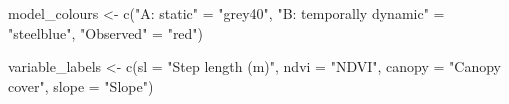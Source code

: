 \documentclass[
  letterpaper,
  DIV=11,
  numbers=noendperiod]{scrartcl}
\newenvironment{Shaded}{\begin{snugshade}}{\end{snugshade}}
\newcommand{\AttributeTok}[1]{\textcolor[rgb]{0.40,0.45,0.13}{#1}}
\newcommand{\FunctionTok}[1]{\textcolor[rgb]{0.28,0.35,0.67}{#1}}
\newcommand{\NormalTok}[1]{\textcolor[rgb]{0.00,0.23,0.31}{#1}}
\newcommand{\OtherTok}[1]{\textcolor[rgb]{0.00,0.23,0.31}{#1}}
\newcommand{\StringTok}[1]{\textcolor[rgb]{0.13,0.47,0.30}{#1}}
\begin{document}
\begin{Shaded}
\begin{Highlighting}[]
\NormalTok{model\_colours }\OtherTok{\textless{}{-}} \FunctionTok{c}\NormalTok{(}\StringTok{"A: static"} \OtherTok{=} \StringTok{"grey40"}\NormalTok{,}
                   \StringTok{"B: temporally dynamic"} \OtherTok{=} \StringTok{"steelblue"}\NormalTok{,}
                   \StringTok{"Observed"} \OtherTok{=} \StringTok{"red"}\NormalTok{)}

\NormalTok{variable\_labels }\OtherTok{\textless{}{-}} \FunctionTok{c}\NormalTok{(}\AttributeTok{sl =} \StringTok{"Step length (m)"}\NormalTok{, }\AttributeTok{ndvi =} \StringTok{"NDVI"}\NormalTok{,}
                     \AttributeTok{canopy =} \StringTok{"Canopy cover"}\NormalTok{, }\AttributeTok{slope =} \StringTok{"Slope"}\NormalTok{)}


\end{Highlighting}
\end{Shaded}
\end{document}
